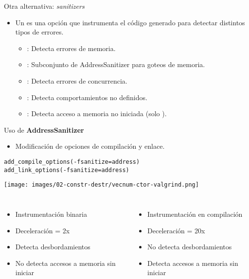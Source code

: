 \begin{frame}[t]{Otra alternativa: \emph{sanitizers}}
\begin{itemize}
  \item Un  es una opción que instrumenta el código generado
        para detectar distintos tipos de errores.
    \begin{itemize}
      \item {}: Detecta errores de memoria.
      \item {}: Subconjunto de AddressSanitizer para goteos de memoria.
      \item {}: Detecta errores de concurrencia.
      \item {}: Detecta comportamientos no definidos.
      \item {}: Detecta acceso a memoria no iniciada (solo ).
    \end{itemize}
\end{itemize}
\end{frame}

\begin{frame}[t,fragile]{Uso de \textbf{AddressSanitizer}}
\begin{itemize}
  \item Modificación de opciones de compilación y enlace.
\end{itemize}
\begin{lstlisting}
add_compile_options(-fsanitize=address)
add_link_options(-fsanitize=address)
\end{lstlisting}
\texttt{[image: images/02-constr-destr/vecnum-ctor-valgrind.png]}

\begin{columns}[T]
{
\begin{itemize}
  \item Instrumentación binaria
  \item Deceleración = 2x
  \item Detecta desbordamientos
  \item No detecta accesos a memoria sin iniciar
\end{itemize}
}

{
\begin{itemize}
  \item Instrumentación en compilación
  \item Deceleración = 20x
  \item No detecta desbordamientos
  \item Detecta accesos a memoria sin iniciar
\end{itemize}
}

\end{columns}
\end{frame}
